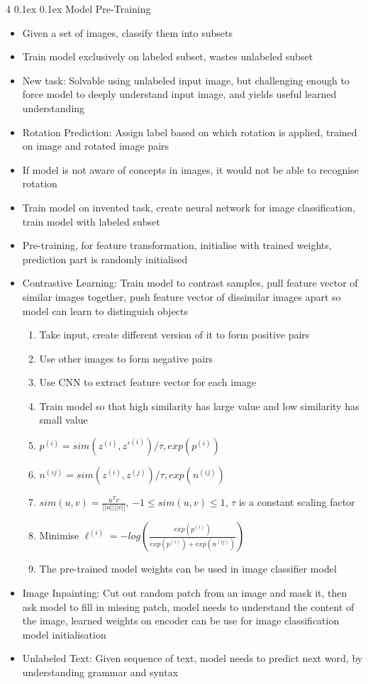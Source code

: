 \documentclass[10pt, landscape]{article}
\makeatletter
\renewcommand{\subsection}{\@startsection{subsection}{2}{0mm}%
  {0.1ex} %
  {0.1ex} %
  {\normalfont\normalsize\bfseries}}
\makeatother
\begin{document}
\begin{multicols*}{4}
\subsection{Model Pre-Training}
\begin{itemize}
    \item Given a set of images, classify them into subsets
    \item Train model exclusively on labeled subset, wastes unlabeled subset
    \item New task: Solvable using unlabeled input image, but challenging enough to force model to deeply understand input image, and yields useful learned understanding
    \item Rotation Prediction: Assign label based on which rotation is applied, trained on image and rotated image pairs
    \item If model is not aware of concepts in images, it would not be able to recognise rotation
    \item Train model on invented task, create neural network for image classification, train model with labeled subset
    \item Pre-training, for feature transformation, initialise with trained weights, prediction part is randomly initialised
    \item Contrastive Learning: Train model to contrast samples, pull feature vector of similar images together, push feature vector of dissimilar images apart so model can learn to distinguish objects
    \begin{enumerate}
        \item Take input, create different version of it to form positive pairs
        \item Use other images to form negative pairs
        \item Use CNN to extract feature vector for each image
        \item Train model so that high similarity has large value and low similarity has small value
        \item $p^{(i)}=sim(z^{(i)}, z'^{(i)})/\tau, exp(p^{(i)})$
        \item $n^{(ij)}=sim(z^{(i)}, z^{(j)})/\tau, exp(n^{(ij)})$
        \item $sim(u,v)=\frac{u^Tv}{||u||||v||}$, $-1 \leq sim(u,v) \leq 1$, $\tau$ is a constant scaling factor
        \item Minimise $\ell^{(i)}=-log(\frac{exp(p^{(i)})}{exp(p^{(i)})+exp(n^{(ij)})})$
        \item The pre-trained model weights can be used in image classifier model
    \end{enumerate}
    \item Image Inpainting: Cut out random patch from an image and mask it, then ask model to fill in missing patch, model needs to understand the content of the image, learned weights on encoder can be use for image classification model initialisation
    \item Unlabeled Text: Given sequence of text, model needs to predict next word, by understanding grammar and syntax
\end{itemize}

\end{multicols*}
\end{document}
